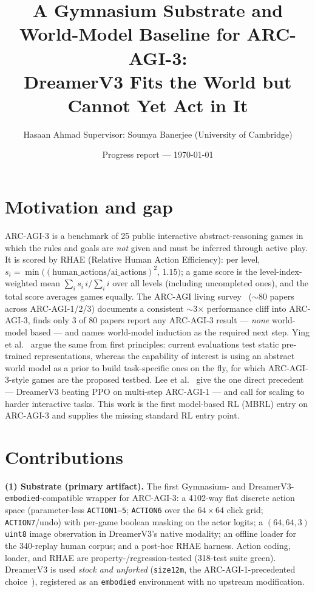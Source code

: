 \documentclass[10pt]{article}
\title{\vspace{-1.6cm}A Gymnasium Substrate and World-Model Baseline for ARC-AGI-3:\\
\large DreamerV3 Fits the World but Cannot Yet Act in It}
\author{Hasaan Ahmad \quad\textbar\quad Supervisor: Soumya Banerjee (University of Cambridge)}
\date{Progress report --- \today}
\begin{document}
\maketitle
\vspace{-1.2em}

\section{Motivation and gap}
ARC-AGI-3 is a benchmark of 25 public interactive abstract-reasoning games in
which the rules and goals are \emph{not} given and must be inferred through
active play. It is scored by RHAE (Relative Human Action Efficiency): per level,
$s_i=\min\big((\text{human\_actions}/\text{ai\_actions})^2,\,1.15\big)$; a game
score is the level-index-weighted mean $\sum_i s_i\, i / \sum_i i$ over all
levels (including uncompleted ones), and the total score averages games equally.
The ARC-AGI living survey~\cite{survey2026} ($\sim$80 papers across
ARC-AGI-1/2/3) documents a consistent $\sim$3$\times$ performance cliff into
ARC-AGI-3, finds only 3 of 80 papers report any ARC-AGI-3 result --- \emph{none}
world-model based --- and names world-model induction as the required next step.
Ying et al.~\cite{ying2025} argue the same from first principles: current
evaluations test static pre-trained representations, whereas the capability of
interest is using an abstract world model as a prior to build task-specific ones
on the fly, for which ARC-AGI-3-style games are the proposed testbed. Lee et
al.~\cite{lee2024} give the one direct precedent --- DreamerV3 beating PPO on
multi-step ARC-AGI-1 --- and call for scaling to harder interactive tasks. This
work is the first model-based RL (MBRL) entry on ARC-AGI-3 and supplies the
missing standard RL entry point.

\section{Contributions}
\textbf{(1) Substrate (primary artifact).} The first Gymnasium- and
DreamerV3-\texttt{embodied}-compatible wrapper for ARC-AGI-3: a 4102-way flat
discrete action space (parameter-less \texttt{ACTION1--5}; \texttt{ACTION6}
over the $64\!\times\!64$ click grid; \texttt{ACTION7}/undo) with per-game
boolean masking on the actor logits; a $(64,64,3)$ \texttt{uint8} image
observation in DreamerV3's native modality; an offline loader for the
340-replay human corpus; and a post-hoc RHAE harness. Action coding, loader,
and RHAE are property-/regression-tested (318-test suite green). DreamerV3 is
used \emph{stock and unforked} (\texttt{size12m}, the ARC-AGI-1-precedented
choice~\cite{lee2024}), registered as an \texttt{embodied} environment with no
upstream modification.
\end{document}
